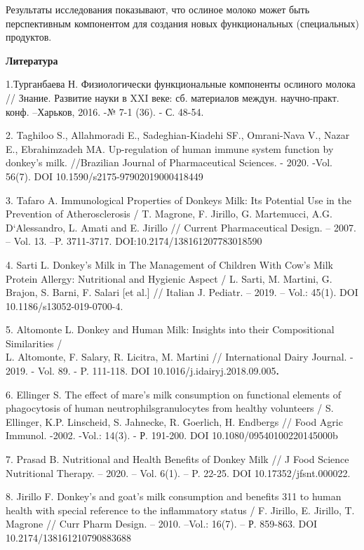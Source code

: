 Результаты исследования показывают, что ослиное молоко может быть
перспективным компонентом для создания новых функциональных
(специальных) продуктов.

{\bfseries Литература}

1.Турганбаева Н. Физиологически функциональные компоненты ослиного
молока // Знание. Развитие науки в XXI веке: сб. материалов междун.
научно-практ. конф. --Харьков, 2016. -№ 7-1 (36). - С. 48-54.

2. Taghiloo S., Allahmoradi E., Sadeghian-Kiadehi SF., Omrani-Nava V.,
Nazar E., Ebrahimzadeh MA. Up-regulation of human immune system function
by donkey's milk. //Brazilian Journal of Pharmaceutical Sciences. -
2020. -Vol. 56(7). DOI 10.1590/s2175-97902019000418449

3. Tafaro A. Immunological Properties of Donkeys Milk: Its Potential Use
in the Prevention of Atherosclerosis / T. Magrone, F. Jirillo, G.
Martemucci, A.G. D`Alessandro, L. Amati and E. Jirillo // Current
Pharmaceutical Design. -- 2007. -- Vol. 13. --P. 3711-3717.
DOI:10.2174/138161207783018590

4. Sarti L. Donkey's Milk in The Management of Children With Cow's Milk
Protein Allergy: Nutritional and Hygienic Aspect / L. Sarti, M. Martini,
G. Brajon, S. Barni, F. Salari {[}et al.{]} // Italian J. Pediatr. --
2019. -- Vol.: 45(1). DOI 10.1186/s13052-019-0700-4.

5. Altomonte L. Donkey and Human Milk: Insights into their Compositional
Similarities /\\
L. Altomonte, F. Salary, R. Licitra, M. Martini // International Dairy
Journal. - 2019. - Vol. 89. - P. 111-118. DOI
10.1016/j.idairyj.2018.09.005{\bfseries .}

6. Ellinger S. The effect of mare's milk consumption on functional
elements of phagocytosis of human neutrophilsgranulocytes from healthy
volunteers / S. Ellinger, K.P. Linscheid, S. Jahnecke, R. Goerlich, H.
Endbergs // Food Agric Immunol. -2002. -Vol.: 14(3). - Р. 191-200. DOI
10.1080/09540100220145000b

7. Prasad B. Nutritional and Health Benefits of Donkey Milk // J Food
Science Nutritional Therapy. -- 2020. -- Vol. 6(1). -- P. 22-25. DOI
10.17352/jfsnt.000022.

8. Jirillo F. Donkey's and goat's milk consumption and benefits 311 to
human health with special reference to the inflammatory status / F.
Jirillo, E. Jirillo, T. Magrone // Curr Pharm Design. -- 2010. --Vol.:
16(7). -- Р. 859-863. DOI 10.2174/138161210790883688


